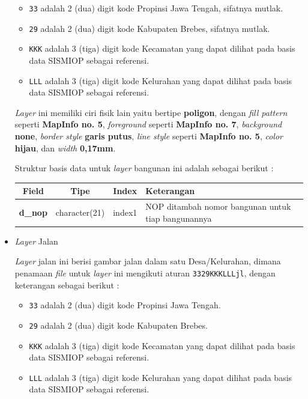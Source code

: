 \begin{itemize}
  \begin{itemize}
    \item \texttt{33} adalah 2 (dua) digit kode Propinsi Jawa Tengah, sifatnya mutlak.
    \item \texttt{29} adalah 2 (dua) digit kode Kabupaten Brebes, sifatnya mutlak.
    \item \texttt{KKK} adalah 3 (tiga) digit kode Kecamatan yang dapat dilihat pada basis data SISMIOP sebagai referensi.
    \item \texttt{LLL} adalah 3 (tiga) digit kode Kelurahan yang dapat dilihat pada basis data SISMIOP sebagai referensi.
  \end{itemize}
  
  \textit{Layer} ini memiliki ciri fisik lain yaitu bertipe \textbf{poligon}, dengan \textit{fill pattern} seperti \textbf{MapInfo no. 5}, \textit{foreground} seperti \textbf{MapInfo no. 7}, \textit{background} \textbf{none}, \textit{border style} \textbf{garis putus}, \textit{line style} seperti \textbf{MapInfo no. 5}, \textit{color} \textbf{hijau}, dan \textit{width} \textbf{0,17mm}.
  
  Struktur basis data untuk \textit{layer} bangunan ini adalah sebagai berikut :
  
  \begin{table}[H]
    \centering
    \begin{tabular}{| c | c | c | p{7cm} |}
      \hline
      Field & Tipe & Index & Keterangan \\
      \hline\hline
      \textbf{d\_nop} & character(21) & index1 & NOP ditambah nomor bangunan untuk tiap bangunannya \\
      \hline
    \end{tabular}
  \end{table}
  
  \item \textit{Layer} Jalan
  
  \textit{Layer} jalan ini berisi gambar jalan dalam satu Desa/Kelurahan, dimana penamaan \textit{file} untuk \textit{layer} ini mengikuti aturan \texttt{3329KKKLLLjl}, dengan keterangan sebagai berikut :
  
  \begin{itemize}
    \item \texttt{33} adalah 2 (dua) digit kode Propinsi Jawa Tengah.
    \item \texttt{29} adalah 2 (dua) digit kode Kabupaten Brebes.
    \item \texttt{KKK} adalah 3 (tiga) digit kode Kecamatan yang dapat dilihat pada basis data SISMIOP sebagai referensi.
    \item \texttt{LLL} adalah 3 (tiga) digit kode Kelurahan yang dapat dilihat pada basis data SISMIOP sebagai referensi.
  \end{itemize}
  

\end{itemize}
